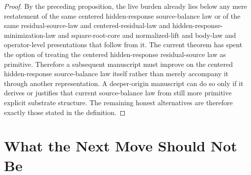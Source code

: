 \documentclass[11pt]{article}
\begin{document}
\begin{proof}
By the preceding proposition, the live burden already lies below any mere restatement of the same centered hidden-response source-balance law or of the same residual-source-law and centered-residual-law and hidden-response-minimization-law and square-root-core and normalized-lift and body-law and operator-level presentations that follow from it. The current theorem has spent the option of treating the centered hidden-response residual-source law as primitive. Therefore a subsequent manuscript must improve on the centered hidden-response source-balance law itself rather than merely accompany it through another representation. A deeper-origin manuscript can do so only if it derives or justifies that current source-balance law from still more primitive explicit substrate structure. The remaining honest alternatives are therefore exactly those stated in the definition.
\end{proof}

\section{What the Next Move Should Not Be}
\end{document}
